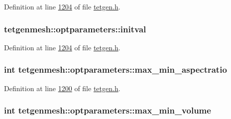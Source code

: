 Definition at line \hyperlink{tetgen_8h_source_l01204}{1204} of file \hyperlink{tetgen_8h_source}{tetgen.\+h}.

\subsubsection[{\texorpdfstring{initval}{initval}}]{ tetgenmesh\+::optparameters\+::initval}\hypertarget{classtetgenmesh_1_1optparameters_a06ad962f12e69b344f409f6e835d27ec}{}\label{classtetgenmesh_1_1optparameters_a06ad962f12e69b344f409f6e835d27ec}


Definition at line \hyperlink{tetgen_8h_source_l01204}{1204} of file \hyperlink{tetgen_8h_source}{tetgen.\+h}.

\subsubsection[{\texorpdfstring{max\+\_\+min\+\_\+aspectratio}{max_min_aspectratio}}]{\setlength{\rightskip}{0pt plus 5cm}int tetgenmesh\+::optparameters\+::max\+\_\+min\+\_\+aspectratio}\hypertarget{classtetgenmesh_1_1optparameters_a844aa0c436ff6021d3c1f7132584faa6}{}\label{classtetgenmesh_1_1optparameters_a844aa0c436ff6021d3c1f7132584faa6}


Definition at line \hyperlink{tetgen_8h_source_l01200}{1200} of file \hyperlink{tetgen_8h_source}{tetgen.\+h}.

\subsubsection[{\texorpdfstring{max\+\_\+min\+\_\+volume}{max_min_volume}}]{\setlength{\rightskip}{0pt plus 5cm}int tetgenmesh\+::optparameters\+::max\+\_\+min\+\_\+volume}\hypertarget{classtetgenmesh_1_1optparameters_ac9adc44bb0076f3b2e5c11c0bf831278}{}\label{classtetgenmesh_1_1optparameters_ac9adc44bb0076f3b2e5c11c0bf831278}


